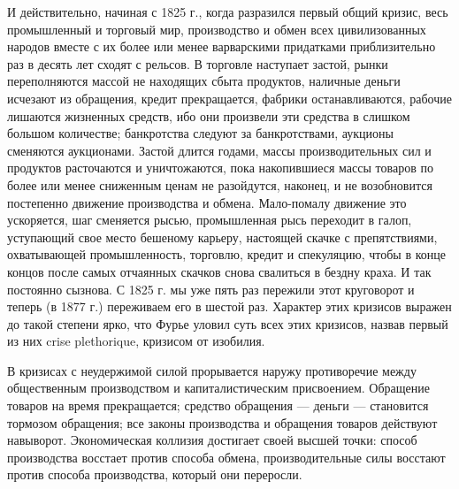 \documentclass[12pt]{article}
\newcommand{\parnum}{(\arabic{parcount})}
\newcounter{parcount}
\newenvironment{parnumbers}{%
  \par%
  \everypar{\noindent \stepcounter{parcount}\marginpar[]{\parnum}}%
}{}
\begin{document}
\begin{parnumbers}
    И действительно, начиная с 1825 г., когда разразился первый общий кризис, весь промышленный и торговый мир, производство и обмен всех цивилизованных народов вместе с их более или менее варварскими придатками приблизительно раз в десять лет сходят с рельсов. В торговле наступает застой, рынки переполняются массой не находящих сбыта продуктов, наличные деньги исчезают из обращения, кредит прекращается, фабрики останавливаются, рабочие лишаются жизненных средств, ибо они произвели эти средства в слишком большом количестве; банкротства следуют за банкротствами, аукционы сменяются аукционами. Застой длится годами, массы производительных сил и продуктов расточаются и уничтожаются, пока накопившиеся массы товаров по более или менее сниженным ценам не разойдутся, наконец, и не возобновится постепенно движение производства и обмена. Мало-помалу движение это ускоряется, шаг сменяется рысью, промышленная рысь переходит в галоп, уступающий свое место бешеному карьеру, настоящей скачке с препятствиями, охватывающей промышленность, торговлю, кредит и спекуляцию, чтобы в конце концов после самых отчаянных скачков снова свалиться в бездну краха. И так постоянно сызнова. С 1825 г. мы уже пять раз пережили этот круговорот и теперь (в 1877 г.) переживаем его в шестой раз. Характер этих кризисов выражен до такой степени ярко, что Фурье уловил суть всех этих кризисов, назвав первый из них crise plethorique, кризисом от изобилия.

    В кризисах с неудержимой силой прорывается наружу противоречие между общественным производством и капиталистическим присвоением. Обращение товаров на время прекращается; средство обращения — деньги — становится тормозом обращения; все законы производства и обращения товаров действуют навыворот. Экономическая коллизия достигает своей высшей точки: способ производства восстает против способа обмена, производительные силы восстают против способа производства, который они переросли.


\end{parnumbers}
\end{document}

